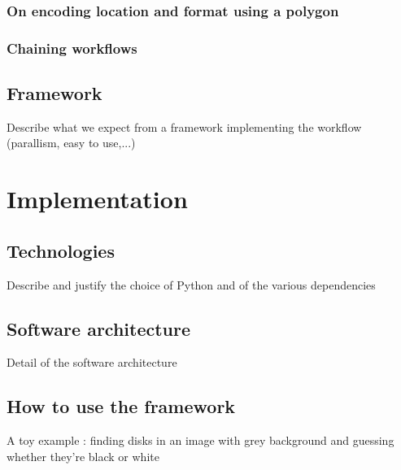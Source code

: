 \subsubsection{On encoding location and format using a polygon}
\label{sssec:choice_polygon}

\subsubsection{Chaining workflows}

\subsection{Framework}

Describe what we expect from a framework implementing the workflow (parallism, easy to use,...) 


\section{Implementation}
\subsection{Technologies}
Describe and justify the choice of Python and of the various dependencies
\subsection{Software architecture}
Detail of the software architecture
\subsection{How to use the framework}
A toy example : finding disks in an image with grey background and guessing whether they're black or white 